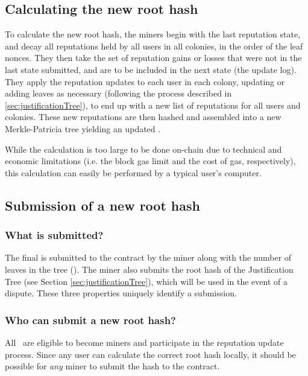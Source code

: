 \subsection{Calculating the new root hash}
To calculate the new root hash, the miners begin with the last reputation state, and decay all reputations held by all users in all colonies, in the order of the leaf nonces. They then take the set of reputation gains or losses that were not in the last state submitted, and are to be included in the next state (the update log). They apply the reputation updates to each user in each colony, updating or adding leaves as necessary (following the process described in \ref{sec:justificationTree}), to end up with a new list of reputations for all users and colonies. These new reputations are then hashed and assembled into a new Merkle-Patricia tree yielding an updated .

While the calculation is too large to be done on-chain due to technical and economic limitations (i.e. the block gas limit and the cost of gas, respectively), this calculation can easily be performed by a typical user's computer.

\subsection{Submission of a new root hash}
%
\subsubsection*{What is submitted?}
The final  is submitted to the contract by the miner along with the number of leaves in the tree (). The miner also submits the root hash of the Justification Tree (see Section \ref{sec:justificationTree}), which will be used in the event of a dispute. These three properties uniquely identify a submission.
%
\subsubsection*{Who can submit a new root hash?}
All \rcths\ are eligible to become miners and participate in the reputation update process. Since any user can calculate the correct root hash locally, it should be possible for \emph{any} miner to submit the hash to the contract.

